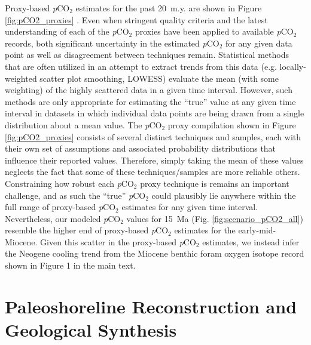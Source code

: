 \documentclass[11pt,letterpaper]{article}
\newcommand{\pCOtwo}{\textit{p}CO$_{2}$\xspace}
\begin{document}
Proxy-based \pCOtwo estimates for the past 20~m.y. are shown in Figure \ref{fig:pCO2_proxies} \citep{Bereiter2015a, Foster2017a, Ji2018a, Cui2020a}. Even when stringent quality criteria and the latest understanding of each of the \pCOtwo proxies have been applied to available \pCOtwo records, both significant uncertainty in the estimated \pCOtwo for any given data point as well as disagreement between techniques remain. Statistical methods that are often utilized in an attempt to extract trends from this data (e.g. locally-weighted scatter plot smoothing, LOWESS) evaluate the mean (with some weighting) of the highly scattered data in a given time interval. However, such methods are only appropriate for estimating the ``true'' value at any given time interval in datasets in which individual data points are being drawn from a single distribution about a mean value. The \pCOtwo proxy compilation shown in Figure \ref{fig:pCO2_proxies} consists of several distinct techniques and samples, each with their own set of assumptions and associated probability distributions that influence their reported values. Therefore, simply taking the mean of these values neglects the fact that some of these techniques/samples are more reliable others. Constraining how robust each \pCOtwo proxy technique is remains an important challenge, and as such the ``true'' \pCOtwo could plausibly lie anywhere within the full range of proxy-based \pCOtwo estimates for any given time interval. Nevertheless, our modeled \pCOtwo values for 15~Ma (Fig. \ref{fig:scenario_pCO2_all}) resemble the higher end of proxy-based \pCOtwo estimates for the early-mid-Miocene. Given this scatter in the proxy-based \pCOtwo estimates, we instead infer the Neogene cooling trend from the Miocene benthic foram oxygen isotope record shown in Figure 1 in the main text.

\section*{Paleoshoreline Reconstruction and Geological Synthesis}
\end{document}
